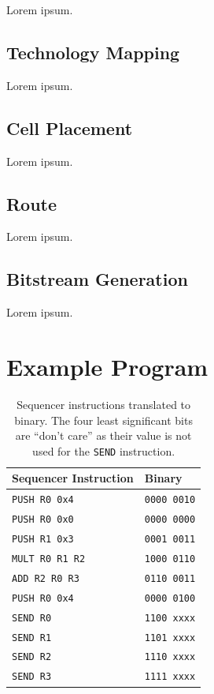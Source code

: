 \documentclass[]{article}
\begin{document}
Lorem ipsum.

\subsection{Technology Mapping}

Lorem ipsum.

\subsection{Cell Placement}

Lorem ipsum.

\subsection{Route}

Lorem ipsum.

\subsection{Bitstream Generation}

Lorem ipsum.

\section{Example Program}

\begin{table}[H]
\centering
\begin{tabular}{ l | l }
\textbf{Sequencer Instruction} & \textbf{Binary}\\\hline
\texttt{PUSH R0 0x4} & \texttt{0000 0010}\\
\texttt{PUSH R0 0x0} & \texttt{0000 0000}\\
\texttt{PUSH R1 0x3} & \texttt{0001 0011}\\
\texttt{MULT R0 R1 R2} & \texttt{1000 0110}\\
\texttt{ADD R2 R0 R3} & \texttt{0110 0011}\\
\texttt{PUSH R0 0x4} & \texttt{0000 0100}\\
\texttt{SEND R0} & \texttt{1100  xxxx}\\
\texttt{SEND R1} & \texttt{1101  xxxx}\\
\texttt{SEND R2} & \texttt{1110  xxxx}\\
\texttt{SEND R3} & \texttt{1111  xxxx}\\
\end{tabular}
\caption{Sequencer instructions translated to binary. The four least significant bits are ``don't care'' as their value is not used for the \texttt{SEND} instruction.}
\label{table:translation}
\end{table}
\end{document}
